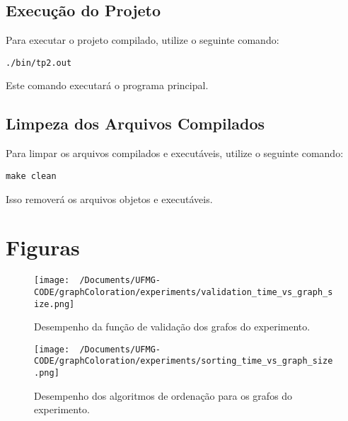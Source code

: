 \documentclass{article}
\begin{document}
\subsection{Execução do Projeto}

Para executar o projeto compilado, utilize o seguinte comando:

\begin{verbatim}
./bin/tp2.out
\end{verbatim}

Este comando executará o programa principal.


\subsection{Limpeza dos Arquivos Compilados}

Para limpar os arquivos compilados e executáveis, utilize o seguinte comando:

\begin{verbatim}
make clean
\end{verbatim}

Isso removerá os arquivos objetos e executáveis.

\newpage
\section{Figuras}

\begin{figure}[H]
    \begin{minipage}{\textwidth}
        \centering
        \texttt{[image: ~/Documents/UFMG-CODE/graphColoration/experiments/validation\_time\_vs\_graph\_size.png]}
        \caption{Desempenho da função de validação dos grafos do experimento.}
        \label{fig:validacao}
    \end{minipage}
\end{figure}

\vspace{1cm}

\begin{figure}[H]
    \begin{minipage}{\textwidth}
        \centering
        \texttt{[image: ~/Documents/UFMG-CODE/graphColoration/experiments/sorting\_time\_vs\_graph\_size.png]}
        \caption{Desempenho dos algoritmos de ordenação para os grafos do experimento.}
        \label{fig:ordenacao}
    \end{minipage}
\end{figure}

\label{ap:figuras}
\end{document}
